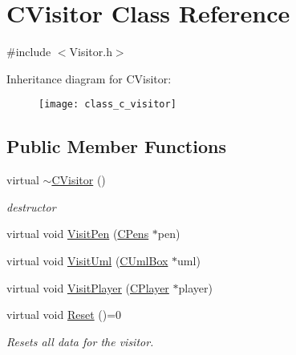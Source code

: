 \hypertarget{class_c_visitor}{}\section{C\+Visitor Class Reference}
\label{class_c_visitor}


{\ttfamily \#include $<$Visitor.\+h$>$}

Inheritance diagram for C\+Visitor\+:\begin{figure}[H]
\begin{center}
\leavevmode
\texttt{[image: class\_c\_visitor]}
\end{center}
\end{figure}
\subsection*{Public Member Functions}
\begin{DoxyCompactItemize}
\item 
\mbox{\label{class_c_visitor_ad0d5cf07dd3a39883287f8922499082a}} 
virtual \mbox{\hyperlink{class_c_visitor_ad0d5cf07dd3a39883287f8922499082a}{$\sim$\+C\+Visitor}} ()
\begin{DoxyCompactList}\small\item\em destructor \end{DoxyCompactList}\item 
virtual void \mbox{\hyperlink{class_c_visitor_ab4ba1c148a5672a48a40596e9ac5a72c}{Visit\+Pen}} (\mbox{\hyperlink{class_c_pens}{C\+Pens}} $\ast$pen)
\item 
virtual void \mbox{\hyperlink{class_c_visitor_abf6343050ae9c2f2526fa6a17ec891a2}{Visit\+Uml}} (\mbox{\hyperlink{class_c_uml_box}{C\+Uml\+Box}} $\ast$uml)
\item 
virtual void \mbox{\hyperlink{class_c_visitor_af177b31b3af36c3eeb8eb70fef63a75c}{Visit\+Player}} (\mbox{\hyperlink{class_c_player}{C\+Player}} $\ast$player)
\item 
\mbox{\label{class_c_visitor_aaab0055438c2be54671d5204b61a0541}} 
virtual void \mbox{\hyperlink{class_c_visitor_aaab0055438c2be54671d5204b61a0541}{Reset}} ()=0
\begin{DoxyCompactList}\small\item\em Resets all data for the visitor. \end{DoxyCompactList}\end{DoxyCompactItemize}


